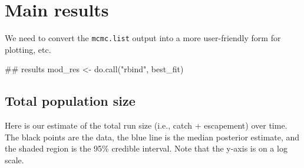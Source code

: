 \documentclass[11pt,]{article}
\newenvironment{Shaded}{}{}
\newcommand{\KeywordTok}[1]{\textcolor[rgb]{0.00,0.00,1.00}{#1}}
\newcommand{\StringTok}[1]{\textcolor[rgb]{0.00,0.50,0.50}{#1}}
\newcommand{\NormalTok}[1]{#1}
\begin{document}
\section{Main results}\label{main-results}

We need to convert the \texttt{mcmc.list} output into a more
user-friendly form for plotting, etc.

\begin{Shaded}
\begin{Highlighting}[]
\NormalTok{## results}
\NormalTok{mod_res <-}\StringTok{ }\KeywordTok{do.call}\NormalTok{(}\StringTok{"rbind"}\NormalTok{, best_fit)}
\end{Highlighting}
\end{Shaded}

\subsection{Total population size}\label{total-population-size}

Here is our estimate of the total run size (i.e., catch + escapement)
over time. The black points are the data, the blue line is the median
posterior estimate, and the shaded region is the 95\% credible interval.
Note that the y-axis is on a log scale.
\end{document}
